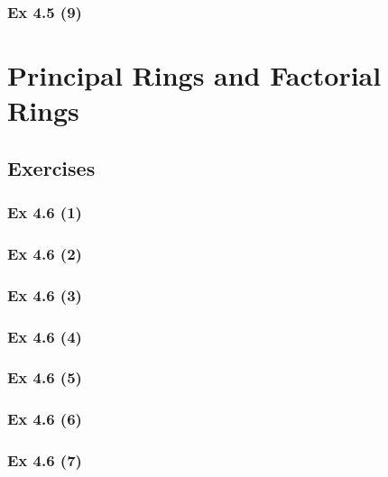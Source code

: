 \subsubsection{Ex 4.5 (9)}\label{sec:Ex_4.5.9}

\newpage		%

\section{Principal Rings and Factorial Rings}\label{sec:4.6}
\subsection{Exercises}\label{sec:4.6_Exercises}

\subsubsection{Ex 4.6 (1)}\label{sec:Ex_4.6.1}

\subsubsection{Ex 4.6 (2)}\label{sec:Ex_4.6.2}

\subsubsection{Ex 4.6 (3)}\label{sec:Ex_4.6.3}

\subsubsection{Ex 4.6 (4)}\label{sec:Ex_4.6.4}

\subsubsection{Ex 4.6 (5)}\label{sec:Ex_4.6.5}

\subsubsection{Ex 4.6 (6)}\label{sec:Ex_4.6.6}

\subsubsection{Ex 4.6 (7)}\label{sec:Ex_4.6.7}

